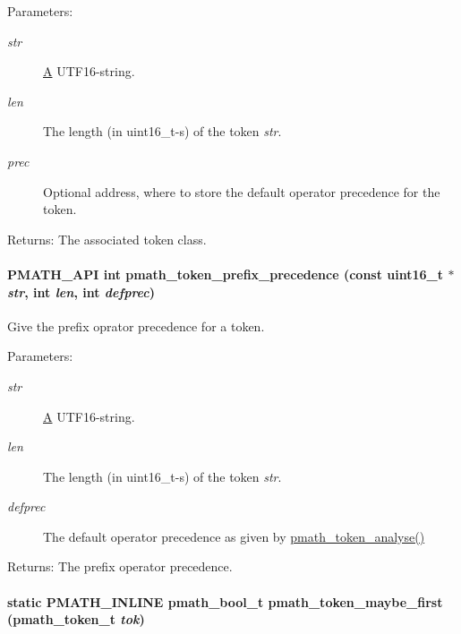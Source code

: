 \begin{Desc}
\item[Parameters:]
\begin{description}
\item[{\em str}]\hyperlink{class_a}{A} UTF16-string. \item[{\em len}]The length (in uint16\_\-t-s) of the token {\em str\/}. \item[{\em prec}]Optional address, where to store the default operator precedence for the token. \end{description}
\end{Desc}
\begin{Desc}
\item[Returns:]The associated token class. \end{Desc}
\hypertarget{group__parser_g4e6cd1a92733aa00d32d48ac1e95aae2}{
\paragraph[{pmath\_\-token\_\-prefix\_\-precedence}]{\setlength{\rightskip}{0pt plus 5cm}PMATH\_\-API int pmath\_\-token\_\-prefix\_\-precedence (const uint16\_\-t $\ast$ {\em str}, \/  int {\em len}, \/  int {\em defprec})}\hfill}
\label{group__parser_g4e6cd1a92733aa00d32d48ac1e95aae2}


Give the prefix oprator precedence for a token. 

\begin{Desc}
\item[Parameters:]
\begin{description}
\item[{\em str}]\hyperlink{class_a}{A} UTF16-string. \item[{\em len}]The length (in uint16\_\-t-s) of the token {\em str\/}. \item[{\em defprec}]The default operator precedence as given by \hyperlink{group__parser_g0cfde53ccdddc80d034dc5ee1ea54508}{pmath\_\-token\_\-analyse()} \end{description}
\end{Desc}
\begin{Desc}
\item[Returns:]The prefix operator precedence. \end{Desc}
\hypertarget{group__parser_gb35bd0bbe60489c1169902df67c3714b}{
\paragraph[{pmath\_\-token\_\-maybe\_\-first}]{\setlength{\rightskip}{0pt plus 5cm}static PMATH\_\-INLINE {\bf pmath\_\-bool\_\-t} pmath\_\-token\_\-maybe\_\-first ({\bf pmath\_\-token\_\-t} {\em tok})}\hfill}
\label{group__parser_gb35bd0bbe60489c1169902df67c3714b}


